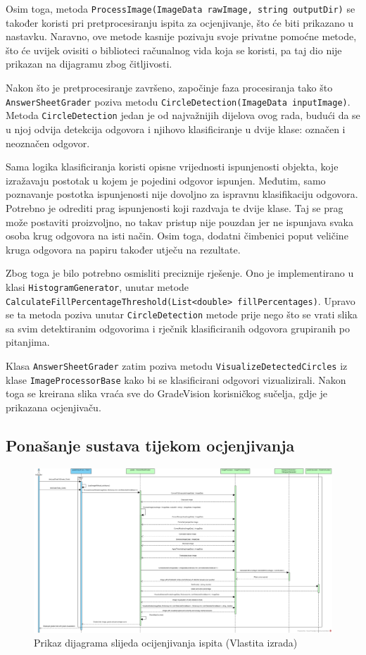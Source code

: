 \documentclass{foi}
\begin{document}
Osim toga, metoda \texttt{ProcessImage(ImageData rawImage, string outputDir)}  se također koristi pri pretprocesiranju ispita za ocjenjivanje, što će biti prikazano u nastavku.
Naravno, ove metode kasnije pozivaju svoje privatne pomoćne metode, što će uvijek ovisiti o biblioteci računalnog vida koja se koristi, pa taj dio nije prikazan na dijagramu zbog čitljivosti.

Nakon što je pretprocesiranje završeno, započinje faza procesiranja tako što \texttt{AnswerSheetGrader} poziva metodu \texttt{CircleDetection(ImageData inputImage)}. Metoda \texttt{CircleDetection} jedan je od najvažnijih dijelova ovog rada, budući da se u njoj odvija detekcija odgovora i njihovo klasificiranje u dvije klase: označen i neoznačen odgovor.

Sama logika klasificiranja koristi opisne vrijednosti ispunjenosti objekta, koje izražavaju postotak u kojem je pojedini odgovor ispunjen. Međutim, samo poznavanje postotka ispunjenosti nije dovoljno za ispravnu klasifikaciju odgovora. Potrebno je odrediti prag ispunjenosti koji razdvaja te dvije klase. Taj se prag može postaviti proizvoljno, no takav pristup nije pouzdan jer ne ispunjava svaka osoba krug odgovora na isti način. Osim toga, dodatni čimbenici poput veličine kruga odgovora na papiru također utječu na rezultate.

Zbog toga je bilo potrebno osmisliti preciznije rješenje. Ono je implementirano u klasi \texttt{HistogramGenerator}, unutar metode \texttt{CalculateFillPercentageThreshold(List<double> fillPercentages)}. Upravo se ta metoda poziva unutar \texttt{CircleDetection} metode prije nego što se vrati slika sa svim detektiranim odgovorima i rječnik klasificiranih odgovora grupiranih po pitanjima.

Klasa \texttt{AnswerSheetGrader} zatim poziva metodu \texttt{VisualizeDetectedCircles} iz klase \texttt{ImageProcessorBase} kako bi se klasificirani odgovori vizualizirali. Nakon toga se kreirana slika vraća sve do GradeVision korisničkog sučelja, gdje je prikazana ocjenjivaču. 

\subsection{Ponašanje sustava tijekom ocjenjivanja}

\begin{figure}[H]
\centering
\includegraphics[width=1.0\linewidth]{slike/sequence2.jpg}
\caption{Prikaz dijagrama slijeda ocijenjivanja ispita (Vlastita izrada)}
\end{figure}
\end{document}
